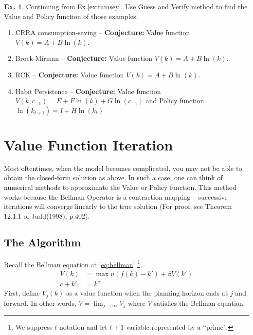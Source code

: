 \documentclass[11pt,a4paper]{book}
\theoremstyle{definition}\newtheorem{definition}{Definition}
\theoremstyle{definition}\newtheorem{fact}{Fact}
\theoremstyle{definition}\newtheorem{remark}{Remark}
\theoremstyle{definition}\newtheorem{ex}{Ex.}
\theoremstyle{definition}\newtheorem{project}{Project}
\theoremstyle{definition}\newtheorem{problem}{Problem}
\theoremstyle{definition}\newtheorem{example}{Example}
\numberwithin{theorem}{section}
\numberwithin{corollary}{chapter}
\numberwithin{assumption}{chapter}
\numberwithin{definition}{chapter}
\numberwithin{prop}{chapter}
\numberwithin{notation}{chapter}
\numberwithin{problem}{chapter}
\numberwithin{example}{chapter}
\numberwithin{fact}{chapter}
\numberwithin{ex}{chapter}
\begin{document}
	\begin{ex}
		Continuing from Ex.\ref{ex:ramsey}. Use Guess and Verify method to find the Value and Policy function of those examples.
		\begin{enumerate}
			\item CRRA consumption-saving -- \textbf{Conjecture:} Value function $V(k) = A + B \ln(k)$.
			\item Brock-Mirman -- \textbf{Conjecture:} Value function $V(k) = A + B \ln(k)$.
			\item RCK -- \textbf{Conjecture:} Value function $V(k) = A + B \ln(k)$.
			\item Habit Persistence -- \textbf{Conjecture:} Value function $V(k, c_{-1}) = E + F\ln(k) + G\ln(c_{-1})$ and Policy function $\ln (k_{t+1}) = I + H \ln (k_t)$
		\end{enumerate}
	\end{ex}
	
	\section{Value Function Iteration}
	Most oftentimes, when the model becomes complicated, you may not be able to obtain the closed-form solution as above. In such a case, one can think of numerical methods to approximate the Value or Policy function. This method works because the Bellman Operator is a contraction mapping -- successive iterations will converge linearly to the true solution (For proof, see Theorem 12.1.1 of Judd(1998), p.402).
	
	\subsection{The Algorithm}
	Recall the Bellman equation at \eqref{eq:bellman} \footnote{We suppress $t$ notation and let $t+1$ variable represented by a ``prime".}.
	\begin{align*}
		V(k) &= \max u(f(k) - k') + \beta V(k') \\
		c + k' &= k^\alpha
	\end{align*}
	First, define $V_j(k)$ as a value function when the planning horizon ends at $j$ and forward. In other words, $V = \lim_{j\to\infty} V_j$ where $V$ satisfies the Bellman equation.
	
\end{document}
